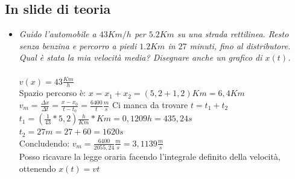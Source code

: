 \documentclass[a4paper,12pt]{report}
\begin{document}
	\subsection{In slide di teoria}
	\begin{itemize}
		\item \textit{Guido l’automobile a $43 Km/h$ per $5.2 Km$ su una strada rettilinea. Resto senza benzina e 
			percorro a piedi $1.2 Km$ in $27$ minuti, fino al distributore. Qual è stata la mia velocità media? 
			Disegnare anche un grafico di $x(t)$.}\\\\
			$v(x) = 43 \frac{Km}{h}$\\
			Spazio percorso è: $x = x_1 + x_2 = (5,2 + 1,2)Km = 6,4Km$\\
			$v_m = \frac{\Delta x}{\Delta t} = \frac{x- x_0}{t - t_0} = \frac{6400}{t}\frac{m}{s}$ Ci manca da trovare $t = t_1 + t_2$\\
			$t_1 = (\frac{1}{43} * 5,2)\frac{h}{Km} * Km = 0,1209h = 435,24s$\\
			$t_2 = 27m = 27 + 60 = 1620s$\\
			Concludendo: $v_m = \frac{6400}{2055,24}\frac{m}{s} = 3,1139\frac{m}{s}$\\
			Posso ricavare la legge oraria facendo l'integrale definito della velocità, ottenendo $x(t) = vt$
	\end{itemize}
\end{document}
